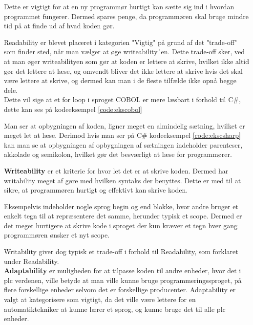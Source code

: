Dette er vigtigt for at en ny programmør hurtigt kan sætte sig ind i hvordan programmet fungerer. Dermed spares penge, da programmøren skal bruge mindre tid på at finde ud af hvad koden gør. 

Readability er blevet placeret i kategorien "Vigtig" på grund af det "trade-off" som finder sted, når man vælger at øge writeability´en.
Dette trade-off sker, ved at man øger writeabilityen som gør at koden er lettere at skrive, hvilket ikke altid gør det lettere at læse, og omvendt bliver det ikke lettere at skrive hvis det skal være lettere at skrive, og dermed kan man i de fleste tilfælde ikke opnå begge dele.
\\
Dette vil sige at et for loop i sproget COBOL er mere læsbart i forhold til C\#, dette kan ses på kodeeksempel \ref{code:ekscobol}


\noindent Man ser at opbygningen af koden, ligner meget en almindelig sætning, hvilket er meget let at læse. Derimod hvis man ser på C\# kodeeksempel \ref{code:ekscsharp} kan man se at opbygningen af opbygningen af sætningen indeholder parenteser, akkolade og semikolon, hvilket gør det besværligt at læse for programmører.



\noindent\textbf{Writeability} er et kriterie for hvor let det er at skrive koden. Dermed har writability meget af gøre med hvilken syntaks der benyttes. Dette er med til at sikre, at programmøren hurtigt og effektivt kan skrive koden.

Eksempelvis indeholder nogle sprog begin og end blokke, hvor andre bruger et enkelt tegn til at repræsentere det samme, herunder typisk et scope. Dermed er det meget hurtigere at skrive kode i sproget der kun kræver et tegn hver gang programmøren ønsker et nyt scope.

Writability giver dog typisk et trade-off i forhold til Readability, som forklaret under Readability.\\

\noindent\textbf{Adaptability} er muligheden for at tilpasse koden til andre enheder, hvor det i \gls{plc} verdenen, ville betyde at man ville kunne bruge programmeringssproget, på flere forskellige enheder selvom det er forskellige producenter. Adaptability er valgt at kategorisere som vigtigt, da det ville være lettere for en automatiktekniker at kunne lærer et sprog, og kunne bruge det til alle \gls{plc} enheder.

